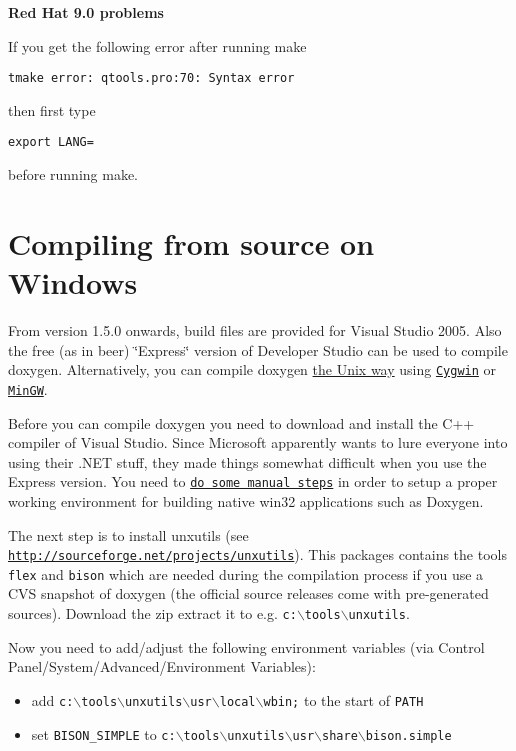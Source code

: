 {\bf Red Hat 9.0 problems}

If you get the following error after running make 

\footnotesize\begin{verbatim}
tmake error: qtools.pro:70: Syntax error
\end{verbatim}
\normalsize
 then first type 

\footnotesize\begin{verbatim}
export LANG=
\end{verbatim}
\normalsize
 before running make.\hypertarget{install_install_src_windows}{}\section{Compiling from source on Windows}\label{install_install_src_windows}
From version 1.5.0 onwards, build files are provided for Visual Studio 2005. Also the free (as in beer) \char`\"{}Express\char`\"{} version of Developer Studio can be used to compile doxygen. Alternatively, you can compile doxygen \hyperlink{install_install_src_unix}{the Unix way} using \href{http://en.wikipedia.org/wiki/Cygwin}{\tt Cygwin} or \href{http://www.mingw.org/}{\tt MinGW}.

Before you can compile doxygen you need to download and install the C++ compiler of Visual Studio. Since Microsoft apparently wants to lure everyone into using their .NET stuff, they made things somewhat difficult when you use the Express version. You need to \href{http://msdn2.microsoft.com/en-gb/express/aa700755.aspx}{\tt do some manual steps} in order to setup a proper working environment for building native win32 applications such as Doxygen.

The next step is to install unxutils (see \href{http://sourceforge.net/projects/unxutils}{\tt http://sourceforge.net/projects/unxutils}). This packages contains the tools {\tt flex} and {\tt bison} which are needed during the compilation process if you use a CVS snapshot of doxygen (the official source releases come with pre-generated sources). Download the zip extract it to e.g. {\tt c:$\backslash$tools$\backslash$unxutils}.

Now you need to add/adjust the following environment variables (via Control Panel/System/Advanced/Environment Variables):\begin{itemize}
\item add {\tt c:$\backslash$tools$\backslash$unxutils$\backslash$usr$\backslash$local$\backslash$wbin;} to the start of {\tt PATH}\item set {\tt BISON\_\-SIMPLE} to {\tt c:$\backslash$tools$\backslash$unxutils$\backslash$usr$\backslash$share$\backslash$bison.simple}\end{itemize}


